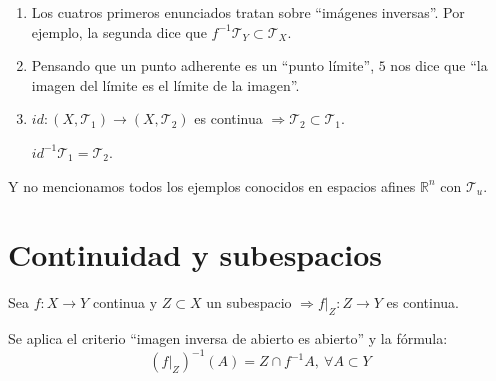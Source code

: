\begin{obs}
\begin{enumerate}
    \item Los cuatros primeros enunciados tratan sobre ``imágenes inversas''. Por ejemplo, la segunda dice que $f^{-1}\mathcal{T}_Y \subset \mathcal{T}_X$.
    \item Pensando que un punto adherente es un ``punto límite'', $5$ nos dice que ``la imagen del límite es el límite de la imagen''.
    \item $id: \left( X, \mathcal{T}_1 \right) \rightarrow \left( X, \mathcal{T}_2 \right)$ es continua $\Rightarrow \mathcal{T}_2 \subset \mathcal{T}_1$. 
    \begin{demo}
        $id^{-1}\mathcal{T}_1 = \mathcal{T}_2$.
    \end{demo}
\end{enumerate}
Y no mencionamos todos los ejemplos conocidos en espacios afines $\mathbb{R}^n$ con $\mathcal{T}_u$.
\end{obs}

\section{Continuidad y subespacios}%
\label{sec:continuidad_y_subespacios}
\begin{prop}
Sea $f: X \rightarrow Y$ continua y $Z \subset X$ un subespacio $\Rightarrow f|_Z : Z \rightarrow Y$ es continua.
\end{prop}
\begin{demo}
Se aplica el criterio ``imagen inversa de abierto es abierto'' y la fórmula:
\[
\left( f|_Z \right)^{-1} \left( A \right) = Z \cap f^{-1}A,\ \forall A \subset Y
\]
\end{demo}

